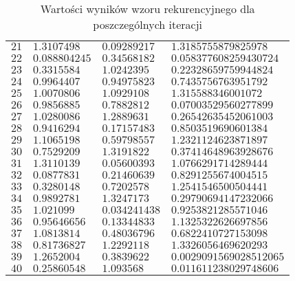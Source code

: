 \documentclass[12pt]{article}
\begin{document}
\begin{table}[h!]
\begin{tabularx}{0.775\textwidth}{l l l l}
            $21$ & $1.3107498$ & $0.09289217$ & $1.3185755879825978$ \\
            $22$ & $0.088804245$ & $0.34568182$ & $0.058377608259430724$ \\
            $23$ & $0.3315584$ & $1.0242395$ & $0.22328659759944824$ \\
            $24$ & $0.9964407$ & $0.94975823$ & $0.7435756763951792$ \\
            $25$ & $1.0070806$ & $1.0929108$ & $1.315588346001072$ \\
            $26$ & $0.9856885$ & $0.7882812$ & $0.07003529560277899$ \\
            $27$ & $1.0280086$ & $1.2889631$ & $0.26542635452061003$ \\
            $28$ & $0.9416294$ & $0.17157483$ & $0.8503519690601384$ \\
            $29$ & $1.1065198$ & $0.59798557$ & $1.2321124623871897$ \\
            $30$ & $0.7529209$ & $1.3191822$ & $0.37414648963928676$ \\
            $31$ & $1.3110139$ & $0.05600393$ & $1.0766291714289444$ \\
            $32$ & $0.0877831$ & $0.21460639$ & $0.8291255674004515$ \\
            $33$ & $0.3280148$ & $0.7202578$ & $1.2541546500504441$ \\
            $34$ & $0.9892781$ & $1.3247173$ & $0.29790694147232066$ \\
            $35$ & $1.021099$ & $0.034241438$ & $0.9253821285571046$ \\
            $36$ & $0.95646656$ & $0.13344833$ & $1.1325322626697856$ \\
            $37$ & $1.0813814$ & $0.48036796$ & $0.6822410727153098$ \\
            $38$ & $0.81736827$ & $1.2292118$ & $1.3326056469620293$ \\
            $39$ & $1.2652004$ & $0.3839622$ & $0.0029091569028512065$ \\
            $40$ & $0.25860548$ & $1.093568$ & $0.011611238029748606$ \\
            \hline
            \end{tabularx}
            \label{table:pupolation_growth}
            \caption{Wartości wyników wzoru rekurencyjnego dla poszczególnych iteracji}
        \end{table}

\newpage
\end{document}
